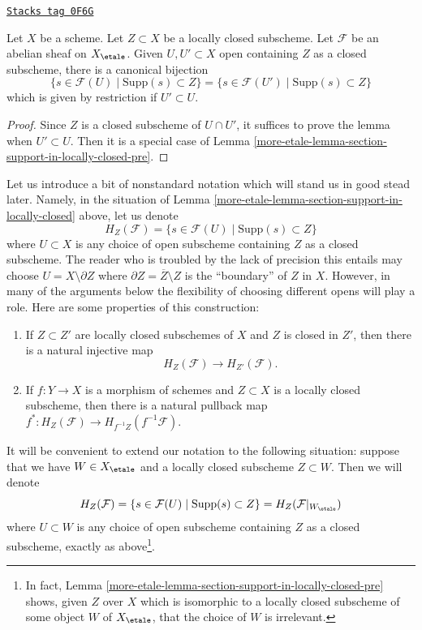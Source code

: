 \begin{lemma}
\label{more-etale-lemma-section-support-in-locally-closed}
\href{https://stacks.math.columbia.edu/tag/0F6G}{\texttt{Stacks tag 0F6G}}

Let $X$ be a scheme. Let $Z \subset X$ be a locally closed subscheme.
Let $\mathcal{F}$ be an abelian sheaf on $X_\etale$. Given
$U, U' \subset X$ open containing $Z$ as a closed subscheme,
there is a canonical bijection
$$
\{s \in \mathcal{F}(U) \mid \text{Supp}(s) \subset Z\} =
\{s \in \mathcal{F}(U') \mid \text{Supp}(s) \subset Z\}
$$
which is given by restriction if $U' \subset U$.
\end{lemma}

\begin{proof}
Since $Z$ is a closed subscheme of $U \cap U'$, it suffices to
prove the lemma when $U' \subset U$. Then it is a special case
of Lemma \ref{more-etale-lemma-section-support-in-locally-closed-pre}.
\end{proof}

Let us introduce a bit of nonstandard notation which will stand us
in good stead later. Namely, in the situation of
Lemma \ref{more-etale-lemma-section-support-in-locally-closed} above, let us denote
$$
H_Z(\mathcal{F}) = \{s \in \mathcal{F}(U) \mid \text{Supp}(s) \subset Z\}
$$
where $U \subset X$ is any choice of open subscheme containing $Z$ as a closed
subscheme. The reader who is troubled by the lack of precision this entails
may choose $U = X \setminus \partial Z$ where
$\partial Z = \overline{Z}\setminus Z$ is the ``boundary'' of $Z$ in $X$.
However, in many of the arguments below the flexibility of choosing
different opens will play a role. Here are some properties of this
construction:
\begin{enumerate}
\item
\label{more-etale-item-inclusion}
If $Z \subset Z'$ are locally closed subschemes of $X$ and $Z$ is
closed in $Z'$, then there is a natural injective map
$$
H_Z(\mathcal{F}) \to H_{Z'}(\mathcal{F}).
$$
\item
\label{more-etale-item-pullback}
If $f : Y \to X$ is a morphism of schemes and $Z \subset X$ is a locally
closed subscheme, then there is a natural
pullback map $f^* : H_Z(\mathcal{F}) \to H_{f^{-1}Z}(f^{-1}\mathcal{F})$.
\end{enumerate}
It will be convenient to extend our notation to the following situation:
suppose that we have $W \in X_\etale$ and a locally closed subscheme
$Z \subset W$. Then we will denote
$$
H_Z(\mathcal{F}) =
\{s \in \mathcal{F}(U) \mid \text{Supp}(s) \subset Z\} =
H_Z(\mathcal{F}|_{W_\etale})
$$
where $U \subset W$ is any choice of open subscheme containing $Z$
as a closed subscheme, exactly as above\footnote{In fact,
Lemma \ref{more-etale-lemma-section-support-in-locally-closed-pre}
shows, given $Z$ over $X$ which is isomorphic to a locally closed
subscheme of some object $W$ of $X_\etale$, that
the choice of $W$ is irrelevant.}.

